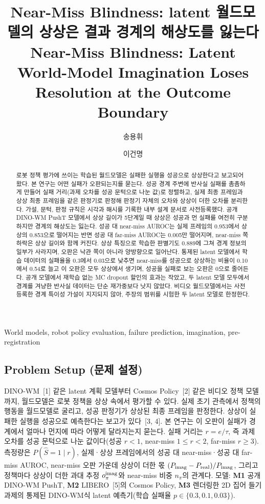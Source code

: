 \documentclass[nouppercase]{kaia}
\title{Near-Miss Blindness: latent 월드모델의 상상은 결과 경계의 해상도를 잃는다\\[2pt]
{\normalsize\normalfont Near-Miss Blindness: Latent World-Model Imagination Loses Resolution at the Outcome Boundary}}
\author{송용휘}{a}
\author{이건명}{b}
\affiliation{충북대학교 정보통신공학부, 대한민국, thddydgnl1937@gmail.com}{a}
\affiliation{충북대학교 소프트웨어학부, 대한민국, kmlee@cbnu.ac.kr}{b}
\begin{document}
\maketitle
\vspace{-34pt}

\begin{mdframed}

\begin{abstract}
로봇 정책 평가에 쓰이는 학습된 월드모델은 실패한 실행을 성공으로 상상한다고 보고되어 왔다. 본 연구는 어떤 실패가 오판되는지를 묻는다. 성공 경계 주변에 반사실 실패를 촘촘하게 만들어 실패 거리(과제 오차를 성공 문턱으로 나눈 값)로 정렬하고, 실제 최종 프레임과 상상 최종 프레임을 같은 판정기로 판정해 판정기 자체의 오차와 상상이 더한 오차를 분리한다. 가설, 문턱, 판정 규칙은 시각과 해시를 기록한 내부 설계 문서로 사전등록했다. 공개 DINO-WM PushT 모델에서 상상 길이가 5단계일 때 상상은 성공과 먼 실패를 여전히 구분하지만 경계의 해상도는 잃는다. 성공 대 near-miss AUROC는 실제 프레임의 0.953에서 상상의 0.853으로 떨어지는 반면 성공 대 far-miss AUROC는 0.005만 떨어지며, near-miss 쪽 하락은 상상 길이와 함께 커진다. 상상 특징으로 학습한 판별기도 0.889에 그쳐 경계 정보의 일부가 사라지며, 오판은 낙관 쪽이 아니라 양방향으로 일어난다. 통제된 latent 모델에서 학습 데이터의 실패율을 0.3에서 0.03으로 낮추면 near-miss를 성공으로 상상하는 비율이 0.10에서 0.54로 늘고 이 오판은 모두 상상에서 생기며, 성공을 실패로 보는 오판은 0으로 줄어든다. 공개 모델에서 재학습 없는 MC dropout 할인의 효과는 작았고, 두 latent 모델 모두에서 경계를 겨냥한 반사실 데이터는 단순 재가중보다 낫지 않았다. 비디오 월드모델에서는 사전등록한 경계 특이성 가설이 지지되지 않아, 주장의 범위를 시험한 두 latent 모델로 한정한다.
\end{abstract}
\begin{keywords}
World models, robot policy evaluation, failure prediction, imagination, pre-registration
\end{keywords}

\subsection{Problem Setup (문제 설정)}
DINO-WM~[1] 같은 latent 계획 모델부터 Cosmos Policy~[2] 같은 비디오 정책 모델까지, 월드모델은 로봇 정책을 상상 속에서 평가할 수 있다. 실제 초기 관측에서 정책의 행동을 월드모델로 굴리고, 성공 판정기가 상상된 최종 프레임을 판정한다. 상상이 실패한 실행을 성공으로 예측한다는 보고가 있다~[3, 4]. 본 연구는 이 오판이 실패가 경계에서 얼마나 먼지에 따라 어떻게 달라지는지 묻는다. 실패 거리는 $r=e/\tau$, 즉 과제 오차를 성공 문턱으로 나눈 값이다(성공 $r<1$, near-miss $1\le r<2$, far-miss $r\ge 3$). 측정량은 $P(\hat S=1\mid r)$, 실제·상상 프레임에서의 성공 대 near-miss·성공 대 far-miss AUROC, near-miss 오판 가운데 상상이 더한 몫 $(P_{\rm imag}-P_{\rm real})/P_{\rm imag}$, 그리고 정책마다 상상이 더한 과대 추정 $o^{\rm imag}_\pi$와 near-miss 비중 $n_\pi$의 관계다. 모델: \textbf{M1} 공개 DINO-WM PushT, \textbf{M2} LIBERO~[5]의 Cosmos Policy, \textbf{M3} 렌더링한 2D 집어 들기 과제의 통제된 DINO-WM식 latent 예측기(학습 실패율 $p\in\{0.3, 0.1, 0.03\}$).


\end{mdframed}
\end{document}
